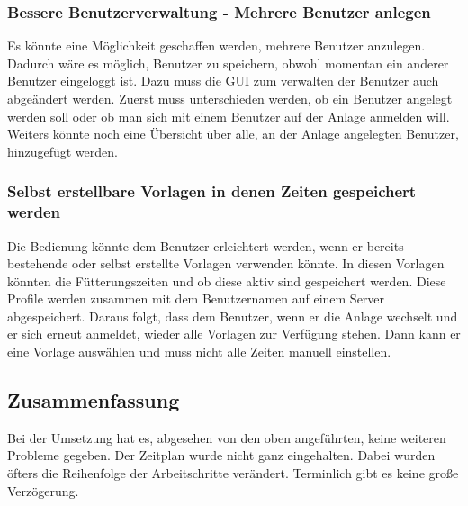 \subsubsection{Bessere Benutzerverwaltung - Mehrere Benutzer anlegen}
Es könnte eine Möglichkeit geschaffen werden, mehrere Benutzer anzulegen. Dadurch wäre es möglich, Benutzer zu speichern, obwohl momentan ein anderer Benutzer eingeloggt ist. Dazu muss die GUI zum verwalten der Benutzer auch abgeändert werden. Zuerst muss unterschieden werden, ob ein Benutzer angelegt werden soll oder ob man sich mit einem Benutzer auf der Anlage anmelden will. Weiters könnte noch eine Übersicht über alle, an der Anlage angelegten Benutzer, hinzugefügt werden.
\subsubsection{Selbst erstellbare Vorlagen in denen Zeiten gespeichert werden}
Die Bedienung könnte dem Benutzer erleichtert werden, wenn er bereits bestehende oder selbst erstellte Vorlagen verwenden könnte. In diesen Vorlagen könnten die Fütterungszeiten und ob diese aktiv sind gespeichert werden. Diese Profile werden zusammen mit dem Benutzernamen auf einem Server abgespeichert. Daraus folgt, dass dem Benutzer, wenn er die Anlage wechselt und er sich erneut anmeldet, wieder alle Vorlagen zur Verfügung stehen. Dann kann er eine Vorlage auswählen und muss nicht alle Zeiten manuell einstellen.

\subsection{Zusammenfassung}
Bei der Umsetzung hat es, abgesehen von den oben angeführten, keine weiteren Probleme gegeben. Der Zeitplan wurde nicht ganz eingehalten. Dabei wurden öfters die Reihenfolge der Arbeitschritte verändert. Terminlich gibt es keine große Verzögerung.